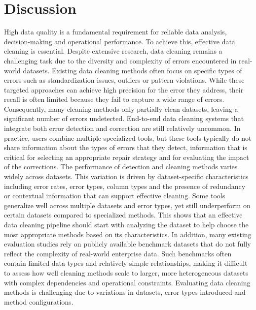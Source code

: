 \section{Discussion}
High data quality is a fundamental requirement for reliable data analysis, decision-making and operational performance. 
To achieve this, effective data cleaning is essential. 
Despite extensive research, data cleaning remains a challenging task due to the diversity and complexity of errors encountered in real-world datasets. 
Existing data cleaning methods often focus on specific types of errors such as standardization issues, outliers or pattern violations. 
While these targeted approaches can achieve high precision for the error they address, their recall is often limited because they fail to capture a wide range of errors. 
Consequently, many cleaning methods only partially clean datasets, leaving a significant number of errors undetected. 
End-to-end data cleaning systems that integrate both error detection and correction are still relatively uncommon. 
In practice, users combine multiple specialized tools, but these tools typically do not share information about the types of errors that they detect, information that is critical for selecting an appropriate repair strategy and for evaluating the impact of the corrections. 
\newline\newline
The performance of detection and cleaning methods varies widely across datasets. 
This variation is driven by dataset-specific characteristics including error rates, error types, column types and the presence of redundancy or contextual information that can support effective cleaning. 
Some tools generalize well across multiple datasets and error types, yet still underperform on certain datasets compared to specialized methods. 
This shows that an effective data cleaning pipeline should start with analyzing the dataset to help choose the most appropriate methods based on its characteristics. 
In addition, many existing evaluation studies rely on publicly available benchmark datasets that do not fully reflect the complexity of real-world enterprise data.
Such benchmarks often contain limited data types and relatively simple relationships, making it difficult to assess how well cleaning methods scale to larger, more heterogeneous datasets with complex dependencies and operational constraints.
\newline\newline
Evaluating data cleaning methods is challenging due to variations in datasets, error types introduced and method configurations. 
